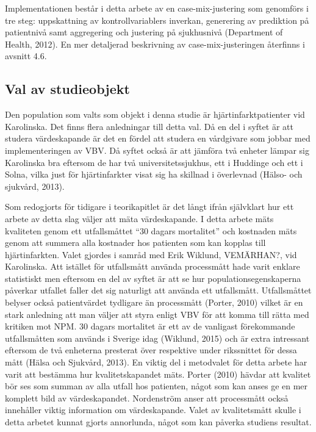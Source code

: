 Implementationen består i detta arbete av en case-mix-justering som genomförs i tre steg: uppskattning av kontrollvariablers inverkan, generering av prediktion på patientnivå samt aggregering och justering på sjukhusnivå (Department of Health, 2012). En mer detaljerad beskrivning av case-mix-justeringen återfinns i avsnitt 4.6.

\subsection{Val av studieobjekt}

Den population som valts som objekt i denna studie är hjärtinfarktpatienter vid Karolinska. Det finns flera anledningar till detta val. Då en del i syftet är att studera värdeskapande är det en fördel att studera en vårdgivare som jobbar med implementeringen av VBV. Då syftet också är att jämföra två enheter lämpar sig Karolinska bra eftersom de har två universitetssjukhus, ett i Huddinge och ett i Solna, vilka just för hjärtinfarkter visat sig ha skillnad i överlevnad (Hälso- och sjukvård, 2013).

Som redogjorts för tidigare i teorikapitlet är det långt ifrån självklart hur ett arbete av detta slag väljer att mäta värdeskapande. I detta arbete mäts kvaliteten genom ett utfallsmåttet “30 dagars mortalitet” och kostnaden mäts genom att summera alla kostnader hos patienten som kan kopplas till hjärtinfarkten. Valet gjordes i samråd med Erik Wiklund, VEMÄRHAN?, vid Karolinska. Att istället för utfallsmått använda processmått hade varit enklare statistiskt men eftersom en del av syftet är att se hur populationsegenskaperna påverkar utfallet faller det sig naturligt att använda ett utfallsmått. Utfallsmåttet belyser också patientvärdet tydligare än processmått (Porter, 2010) vilket är en stark anledning att man väljer att styra enligt VBV för att komma till rätta med kritiken mot NPM. 30 dagars mortalitet är ett av de vanligast förekommande utfallsmåtten som används i Sverige idag (Wiklund, 2015) och är extra intressant eftersom de två enheterna presterat över respektive under rikssnittet för dessa mått (Hälsa och Sjukvård, 2013). En viktig del i metodvalet för detta arbete har varit att bestämma hur kvalitetskapandet mäts. Porter (2010) hävdar att kvalitet bör ses som summan av alla utfall hos patienten, något som kan anses ge en mer komplett bild av värdeskapandet. Nordenström anser att processmått också innehåller viktig information om värdeskapande. Valet av kvalitetsmått skulle i detta arbetet kunnat gjorts annorlunda, något som kan påverka studiens resultat.

